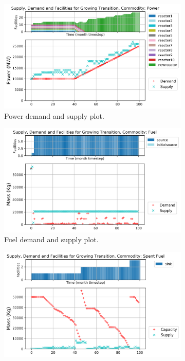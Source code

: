 \documentclass[11pt,letterpaper]{article}
\begin{document}
\begin{figure}[!htbp]
    \centering
    \begin{subfigure}[t]{\textwidth}
    \centering
        \includegraphics[width=\linewidth]{figures/growingtransition-power.png} 
        \caption{Power demand and supply plot.}
        \label{fig:growingtransition-power}
    \end{subfigure}
    \vspace{1cm}
    \begin{subfigure}[t]{0.45\textwidth}
        \centering
        \includegraphics[width=\linewidth]{figures/growingtransition-fuel.png} 
        \caption{Fuel demand and supply plot.}
	    \label{fig:growingtransition-fuel}
    \end{subfigure}
    \hfill
    \begin{subfigure}[t]{0.45\textwidth}
        \centering
        \includegraphics[width=\linewidth]{figures/growingtransition-spentfuel.png} 

\end{subfigure}
\end{figure}
\end{document}
